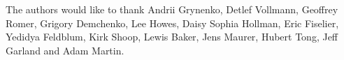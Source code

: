 
The authors would like to thank Andrii Grynenko, Detlef Vollmann, Geoffrey Romer,
Grigory Demchenko, Lee Howes, Daisy Sophia Hollman, Eric Fiselier, Yedidya
Feldblum, Kirk Shoop, Lewis Baker, Jens Maurer, Hubert Tong, Jeff Garland and
Adam Martin.
